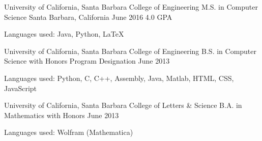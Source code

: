 \begin{cventries}
  \cventry
    {University of California, Santa Barbara \newline College of Engineering}
    {M.S. in Computer Science%
}
    {Santa Barbara, California}
    {June 2016 \newline\vspace{-1mm} 4.0 GPA}
    {
    \begin{cvitems}
	\item {\scriptsize{Languages used: Java, Python, \LaTeX}}
	\end{cvitems}
    }
\cventry
    {University of California, Santa Barbara \newline College of Engineering}
    {B.S. in Computer Science\newline\vspace{-1mm} {\scriptsize \textmd{with Honors Program Designation}}}
    {}
    {June 2013}{
    \begin{cvitems}
	\item {\scriptsize{Languages used: Python, C, C++, Assembly, Java, Matlab, HTML, CSS, JavaScript}}
	\end{cvitems}
}
\cventry
    {University of California, Santa Barbara \newline College of Letters \& Science}
    {B.A. in Mathematics \newline\vspace{-1mm} {\scriptsize \textmd{with Honors}}}
    {    }
    {June 2013}{\begin{cvitems}
	\item {\scriptsize{Languages used: Wolfram (Mathematica)}}
	\end{cvitems}}
\end{cventries}